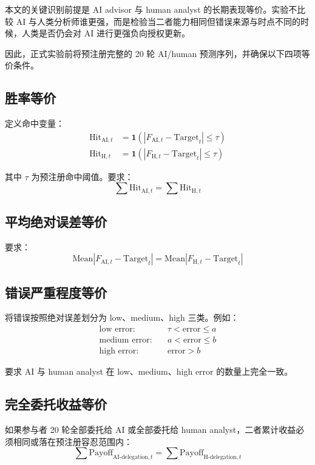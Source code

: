 \documentclass[12pt]{article}
\begin{document}
本文的关键识别前提是 AI advisor 与 human analyst 的长期表现等价。实验不比较 AI 与人类分析师谁更强，而是检验当二者能力相同但错误来源与时点不同的时候，人类是否仍会对 AI 进行更强负向授权更新。

因此，正式实验前将预注册完整的 20 轮 AI/human 预测序列，并确保以下四项等价条件。

\subsection{胜率等价}

定义命中变量：
\begin{align*}
\text{Hit}_{\text{AI},t} &= \mathbf{1}(|F_{\text{AI},t} - \text{Target}_t| \leq \tau) \\
\text{Hit}_{\text{H},t} &= \mathbf{1}(|F_{\text{H},t} - \text{Target}_t| \leq \tau)
\end{align*}

其中 $\tau$ 为预注册命中阈值。要求：
\[
\sum \text{Hit}_{\text{AI},t} = \sum \text{Hit}_{\text{H},t}
\]

\subsection{平均绝对误差等价}

要求：
\[
\text{Mean}|F_{\text{AI},t} - \text{Target}_t| = \text{Mean}|F_{\text{H},t} - \text{Target}_t|
\]

\subsection{错误严重程度等价}

将错误按照绝对误差划分为 low、medium、high 三类。例如：
\begin{align*}
\text{low error:} & \quad \tau < \text{error} \leq a \\
\text{medium error:} & \quad a < \text{error} \leq b \\
\text{high error:} & \quad \text{error} > b
\end{align*}

要求 AI 与 human analyst 在 low、medium、high error 的数量上完全一致。

\subsection{完全委托收益等价}

如果参与者 20 轮全部委托给 AI 或全部委托给 human analyst，二者累计收益必须相同或落在预注册容忍范围内：
\[
\sum \text{Payoff}_{\text{AI-delegation},t} = \sum \text{Payoff}_{\text{H-delegation},t}
\]
\end{document}
